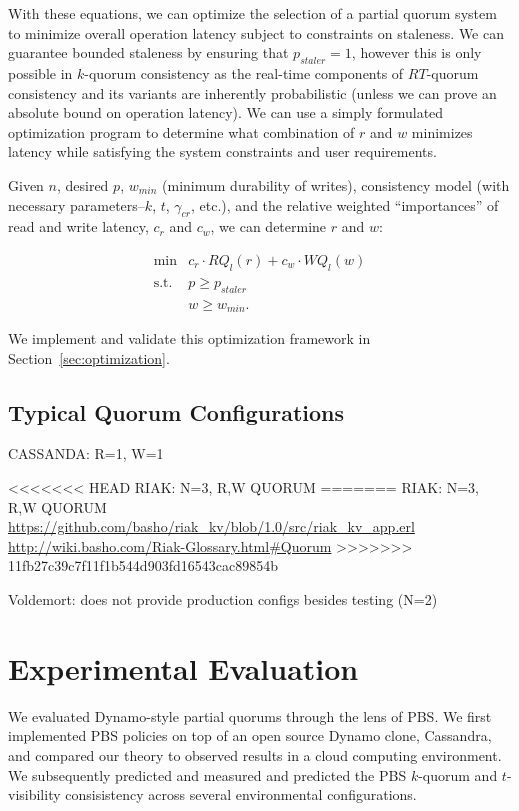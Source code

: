 \documentclass{vldb}
\begin{document}
With these equations, we can optimize the selection of a partial
quorum system to minimize overall operation latency subject to
constraints on staleness. We can guarantee bounded staleness by
ensuring that $p_{staler} = 1$, however this is only possible in
$k$-quorum consistency as the real-time components of $RT$-quorum
consistency and its variants are inherently probabilistic (unless we
can prove an absolute bound on operation latency).  We can use a
simply formulated optimization program to determine what combination
of $r$ and $w$ minimizes latency while satisfying the system
constraints and user requirements.

Given $n$, desired $p$, $w_{min}$ (minimum durability of writes),
consistency model (with necessary parameters--$k$, $t$, $\gamma_{cr}$,
etc.), and the relative weighted ``importances'' of read
and write latency, $c_r$ and $c_w$, we can determine $r$ and $w$:

\begin{equation}
 \begin{array}{rl}
    \min        & c_r\cdot RQ_l(r) +c_w \cdot WQ_l(w) \\
    \mbox{s.t.} & p \ge p_{staler} \\
                & w \ge w_{min}.
    \end{array}
\end{equation}

We implement and validate this optimization framework in
Section~\ref{sec:optimization}.

\subsection{Typical Quorum Configurations}

CASSANDA: R=1, W=1 

<<<<<<< HEAD
RIAK: N=3, R,W QUORUM 
=======
RIAK: N=3, R,W QUORUM \url{https://github.com/basho/riak_kv/blob/1.0/src/riak_kv_app.erl}
\url{http://wiki.basho.com/Riak-Glossary.html#Quorum}
>>>>>>> 11fb27c39c7f11f1b544d903fd16543cac89854b

Voldemort: does not provide production configs besides testing (N=2)

\section{Experimental Evaluation}
\label{sec:eval}

We evaluated Dynamo-style partial quorums through the lens of PBS.  We
first implemented PBS policies on top of an open source Dynamo clone,
Cassandra, and compared our theory to observed results in a cloud
computing environment.  We subsequently predicted and measured and
predicted the PBS $k$-quorum and $t$-visibility consisistency across
several environmental configurations.
\end{document}
